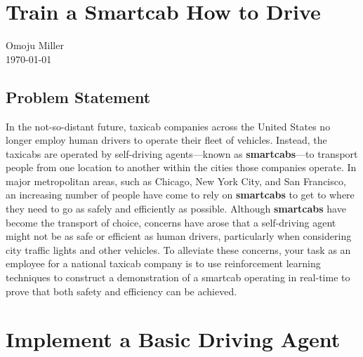 \documentclass[twoside,openright,titlepage,numbers=noenddot,headinclude,%
               footinclude=true,cleardoublepage=empty,abstractoff,BCOR=5mm,%
               paper=a4,fontsize=11pt,ngerman,american]{scrreprt}
\numberwithin{theorem}{chapter}
\numberwithin{definition}{chapter}
\numberwithin{algorithm}{chapter}
\numberwithin{figure}{chapter}
\numberwithin{table}{chapter}
\numberwithin{equation}{chapter}
\begin{document}
\frenchspacing
\raggedbottom
{}
\pagestyle{plain}


%


\cleardoublepage



\chapter*{Train a Smartcab How to Drive}
Omoju Miller\\
\today

\section*{Problem Statement}
In the not-so-distant future, taxicab companies across the United States no longer employ human drivers to operate their fleet of vehicles. Instead, the taxicabs are operated by self-driving agents---known as \textbf{smartcabs}---to transport people from one location to another within the cities those companies operate. In major metropolitan areas, such as Chicago, New York City, and San Francisco, an increasing number of people have come to rely on \textbf{smartcabs} to get to where they need to go as safely and efficiently as possible. Although \textbf{smartcabs} have become the transport of choice, concerns have arose that a self-driving agent might not be as safe or efficient as human drivers, particularly when considering city traffic lights and other vehicles. To alleviate these concerns, your task as an employee for a national taxicab company is to use reinforcement learning techniques to construct a demonstration of a smartcab operating in real-time to prove that both safety and efficiency can be achieved.


%
%

\chapter*{Implement a Basic Driving Agent}
\end{document}
